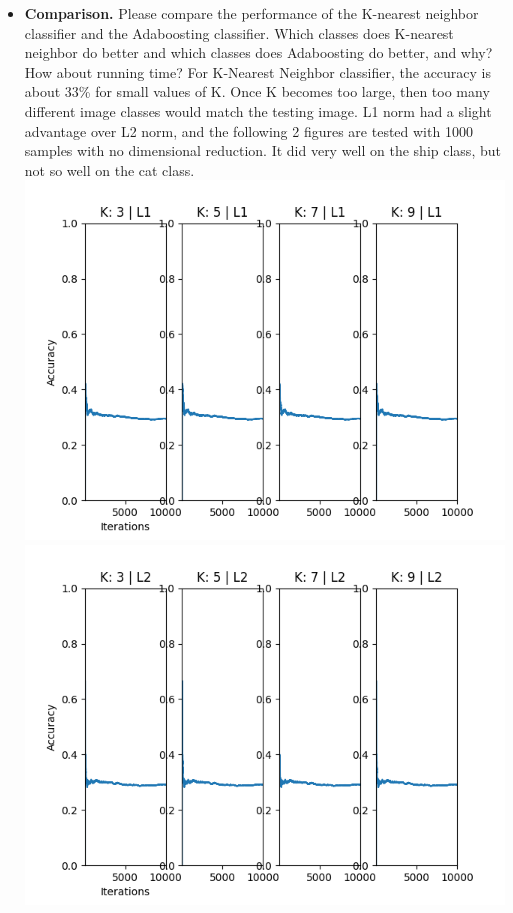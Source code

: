 \documentclass[11pt]{article}
\begin{document}
    \begin{itemize}
        \item \textbf{Comparison.} Please compare the performance of the K-nearest neighbor classifier and the
        Adaboosting classifier. Which classes does K-nearest neighbor do better and which classes does Adaboosting do
        better, and
        why? How about running time?\newline
        For K-Nearest Neighbor classifier, the accuracy is about 33\% for small values of K. Once K becomes too
        large, then too many different image classes would match the testing image. L1 norm had a slight advantage
        over L2 norm, and the following 2 figures are tested with 1000 samples with no dimensional reduction.
        It did very well on the ship class, but not so well on the cat class.\newline
        \includegraphics[width=\textwidth]{Output Pictures/Nearest Neighbors L1}
        \includegraphics[width=\textwidth]{Output Pictures/Nearest Neighbors L2}

\end{itemize}
\end{document}

